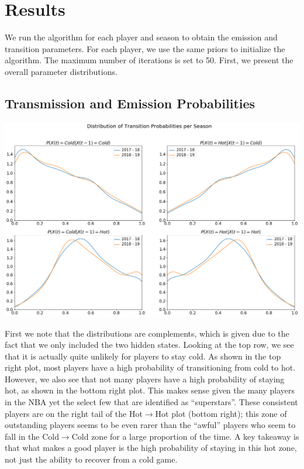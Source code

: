 \documentclass[12pt, authoryear]{elsarticle}
\begin{document}
\newpage

\section{Results}\label{results}

We run the algorithm for each player and season to obtain the emission and transition parameters. For each player, we use the same priors to initialize the algorithm. The maximum number of iterations is set to 50.  First, we present the overall parameter distributions.

\subsection{Transmission and Emission Probabilities}

\includegraphics[scale=0.4]{2distoftransition_probs_perseason}

First we note that the distributions are complements, which is given due to the fact that we only included the two hidden states. Looking at the top row, we see that it is actually quite unlikely for players to stay cold. As shown in the top right plot, most players have a high probability of transitioning from cold to hot. However, we also see that not many players have a high probability of staying hot, as shown in the bottom right plot. This makes sense given the many players in the NBA yet the select few that are identified as “superstars”. These consistent players are on the right tail of the Hot$\rightarrow$Hot plot (bottom right); this zone of outstanding players seems to be even rarer than the “awful” players who seem to fall in the Cold$\rightarrow$Cold zone for a large proportion of the time. A key takeaway is that what makes a good player is the high probability of staying in this hot zone, not just the ability to recover from a cold game.
\end{document}
